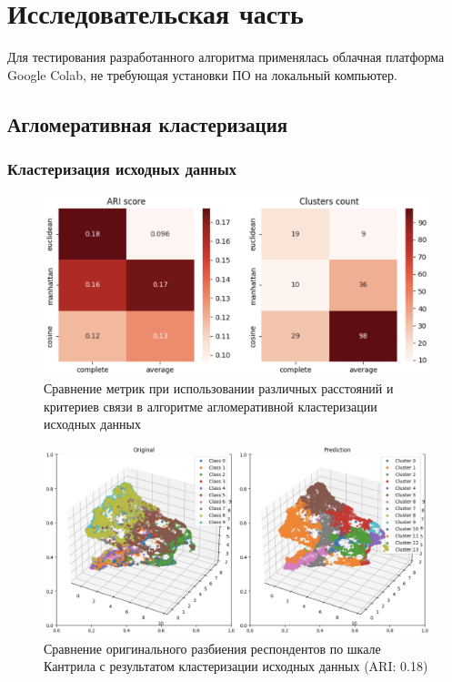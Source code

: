 \chapter{Исследовательская часть}

Для тестирования разработанного алгоритма применялась облачная платформа Google Colab, не требующая установки ПО на локальный компьютер.

\section{Агломеративная кластеризация}

\subsection{Кластеризация исходных данных}

\begin{figure}
	\begin{center}
		\includegraphics[width=\textwidth]{images/1.png}
	\end{center}
	\caption{Сравнение метрик при использовании различных расстояний и критериев связи в алгоритме агломеративной кластеризации исходных данных}
	\label{img:1}
\end{figure}

\begin{figure}
	\begin{center}
		\includegraphics[width=\textwidth]{images/2.png}
	\end{center}
	\caption{Сравнение оригинального разбиения респондентов по шкале Кантрила с результатом кластеризации исходных данных (ARI: 0.18)}
	\label{img:2}
\end{figure}

